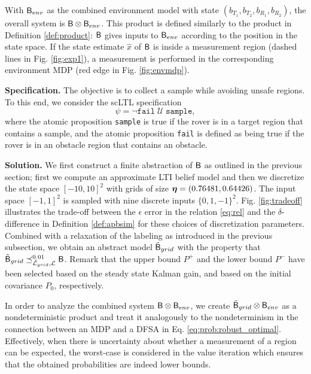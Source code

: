 \documentclass{ifacconf}
\newcommand{\new}[1]{{\color{blue}#1}}
\begin{document}
With $\mathsf{B}_{env}$ as the combined environment model with state $(b_{T_1}, b_{T_2}, b_{R_1}, b_{R_2})$, the overall system is $\mathsf{B} \otimes \mathsf{B}_{env}$. This product is defined similarly to the product in Definition \ref{def:product}: $\mathsf{B}$ gives inputs to $\mathsf{B}_{env}$ according to the position in the state space. If the state estimate $\hat x$ of $\mathsf{B}$ is inside a measurement region (dashed lines in Fig. \ref{fig:exp1}), a measurement is performed in the corresponding environment MDP (red edge in Fig. \ref{fig:envmdp}).


\textbf{Specification.} The objective is to collect a sample while avoiding unsafe regions. To this end, we consider the scLTL specification
\begin{equation}
  \psi =\lnot \texttt{fail} \; \mathcal {U} \; \texttt{sample},
\end{equation}
where the atomic proposition \texttt{sample} is true if the rover is in a target region that contains a sample, and the atomic proposition \texttt{fail} is defined as being true if the rover is in an obstacle region that contains an obstacle.


\textbf{Solution.} We first construct a finite abstraction of $\mathsf{B}$ as outlined in the previous section; first we compute an approximate LTI belief model and then we  discretize the state space $[-10, 10]^2$ with  grids of size ${\boldsymbol{\eta}} = (0.76481, 0.64426)$. The input space $[-1,1]^2$ is sampled with nine discrete inputs $\{0, 1, -1\}^2$. Fig.  \ref{fig:tradeoff} illustrates the trade-off between the $\epsilon$ error in the relation \eqref{eq:rel} and the $\delta$-difference in Definition \ref{def:apbsim} for these choices of discretization parameters. Combined with a relaxation of the labeling as introduced in the previous subsection, %
we obtain an abstract model $\tilde {\mathsf{B}}_{grid}$ with the property that $\tilde {\mathsf{B}}_{grid}\preceq^{0.01}_{\tilde{\mathcal{L}}_{grid},\mathcal{L}} \mathsf{B} $. \new{Remark that the upper bound $P^+$ and the lower bound $P^- $ have been selected based on the steady state Kalman gain, and based on the initial covariance $P_0$, respectively. }

In order to analyze the combined system $\mathsf{B} \otimes \mathsf{B}_{env}$, we create $\tilde {\mathsf{B}}_{grid} \otimes \mathsf{B}_{env}$ as a nondeterministic product and treat it analogously to the nondeterminism in the connection between an MDP and a DFSA in Eq. \eqref{eq:prob:robust_optimal}. Effectively, when there is uncertainty about whether a measurement of a region can be expected, the worst-case is considered in the value iteration which ensures that the obtained probabilities are indeed lower bounds. 
\end{document}
